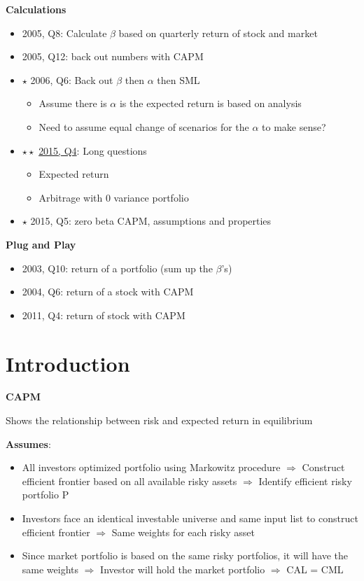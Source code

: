 \documentclass[]{book}
\providecommand{\tightlist}{%
  \setlength{\itemsep}{0pt}\setlength{\parskip}{0pt}}
\theoremstyle{definition}
\theoremstyle{definition}
\theoremstyle{remark}
\begin{document}
\textbf{Calculations}

\begin{itemize}
\tightlist
\item
  2005, Q8: Calculate \(\beta\) based on quarterly return of stock and
  market
\item
  2005, Q12: back out numbers with CAPM
\item
  \(\star\) 2006, Q6: Back out \(\beta\) then \(\alpha\) then SML

  \begin{itemize}
  \tightlist
  \item
    Assume there is \(\alpha\) is the expected return is based on
    analysis
  \item
    Need to assume equal change of scenarios for the \(\alpha\) to make
    sense?
  \end{itemize}
\item
  \(\star \star\) \protect\hyperlink{2015-4}{2015, Q4}: Long questions

  \begin{itemize}
  \tightlist
  \item
    Expected return
  \item
    Arbitrage with 0 variance portfolio
  \end{itemize}
\item
  \(\star\) 2015, Q5: zero beta CAPM, assumptions and properties
\end{itemize}

\textbf{Plug and Play}

\begin{itemize}
\tightlist
\item
  2003, Q10: return of a portfolio (sum up the \(\beta\)'s)
\item
  2004, Q6: return of a stock with CAPM
\item
  2011, Q4: return of stock with CAPM
\end{itemize}

\section{Introduction}\label{introduction-1}

\textbf{CAPM}

Shows the relationship between risk and expected return in equilibrium

\textbf{Assumes}:

\begin{itemize}
\item
  All investors optimized portfolio using Markowitz procedure
  \(\Rightarrow\) Construct efficient frontier based on all available
  risky assets \(\Rightarrow\) Identify efficient risky portfolio P
\item
  Investors face an identical investable universe and same input list to
  construct efficient frontier \(\Rightarrow\) Same weights for each
  risky asset
\item
  Since market portfolio is based on the same risky portfolios, it will
  have the same weights \(\Rightarrow\) Investor will hold the market
  portfolio \(\Rightarrow\) CAL = CML
\end{itemize}
\end{document}
